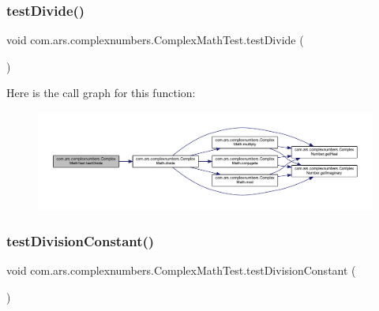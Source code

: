 \subsubsection{\texorpdfstring{test\+Divide()}{testDivide()}}
{\footnotesize\ttfamily void com.\+ars.\+complexnumbers.\+Complex\+Math\+Test.\+test\+Divide (\begin{DoxyParamCaption}{ }\end{DoxyParamCaption})}

Here is the call graph for this function\+:\nopagebreak
\begin{figure}[H]
\begin{center}
\leavevmode
\includegraphics[width=350pt]{classcom_1_1ars_1_1complexnumbers_1_1_complex_math_test_a8ddaa1e32717e2b18f6c64010c688b6d_cgraph}
\end{center}
\end{figure}
\hypertarget{classcom_1_1ars_1_1complexnumbers_1_1_complex_math_test_a7250df204110c40becd58a0886ec8e7c}{}\label{classcom_1_1ars_1_1complexnumbers_1_1_complex_math_test_a7250df204110c40becd58a0886ec8e7c} 
\subsubsection{\texorpdfstring{test\+Division\+Constant()}{testDivisionConstant()}}
{\footnotesize\ttfamily void com.\+ars.\+complexnumbers.\+Complex\+Math\+Test.\+test\+Division\+Constant (\begin{DoxyParamCaption}{ }\end{DoxyParamCaption})}


